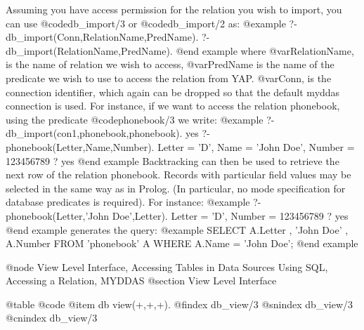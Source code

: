 {{{{{{{{{Assuming you have access permission for the relation you wish to import,
you can use @code{db_import/3} or @code{db_import/2} as:
@example
?- db_import(Conn,RelationName,PredName).
?- db_import(RelationName,PredName).
@end example
 where @var{RelationName}, is the name of
relation we wish to access, @var{PredName} is the name of the predicate we
wish to use to access the relation from YAP. @var{Conn}, is the connection
identifier, which again can be dropped so that the default myddas connection
is used. For instance, if we want to access the relation phonebook,
using the predicate @code{phonebook/3} we write: 
@example
?- db_import(con1,phonebook,phonebook). 
yes
?- phonebook(Letter,Name,Number).
Letter = 'D',
Name = 'John Doe',
Number = 123456789 ? 
yes
@end example
Backtracking can then be used to retrieve the next row
of the relation phonebook.  Records with particular field values may be
selected in the same way as in Prolog. (In particular, no mode
specification for database predicates is required). For instance: 
@example
?- phonebook(Letter,'John Doe',Letter). 
Letter = 'D', 
Number = 123456789 ?
yes
@end example
generates the query:
@example
SELECT A.Letter , 'John Doe' , A.Number 
FROM 'phonebook' A 
WHERE A.Name = 'John Doe';
@end example

@node View Level Interface, Accessing Tables in Data Sources Using SQL, Accessing a Relation, MYDDAS
@section View Level Interface

@table @code
@item db view(+,+,+).
@findex db_view/3
@snindex db_view/3
@cnindex db_view/3

}}}}}}}}}
